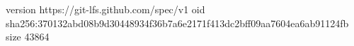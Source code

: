 version https://git-lfs.github.com/spec/v1
oid sha256:370132abd08b9d30448934f36b7a6e2171f413dc2bff09aa7604ea6ab91124fb
size 43864
